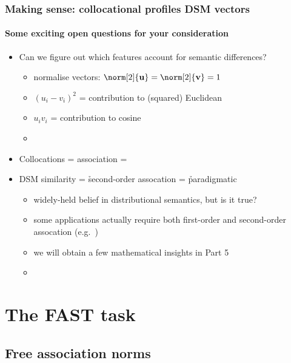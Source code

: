 \documentclass[t]{beamer} %
\begin{document}
\begin{frame}
  \frametitle{Making sense: collocational profiles \vs DSM vectors}
  \framesubtitle{Some exciting open questions for your consideration}
  
  \begin{itemize}
  \item Can we figure out which features account for semantic differences?
    \begin{itemize}
    \item normalise vectors: $\norm[2]{\vu} = \norm[2]{\vv} = 1$
    \item $(u_i - v_i)^2$ = contribution to (squared) Euclidean 
    \item $u_i v_i$ = contribution to cosine 
    \item[]
    \end{itemize}
  \item<2-> Collocations =  association = 
  \item<2->  DSM similarity = \h{second-order} assocation = \h{paradigmatic}
    \begin{itemize}
    \item widely-held belief in distributional semantics, but is it true?
    \item some applications actually require both first-order and second-order assocation (e.g.\ )
    \item[\hand] we will obtain a few  mathematical insights in Part 5
    \item[]
    \end{itemize}
  \end{itemize}

  \vfill
\end{frame}


\section{The FAST task}

\subsection{Free association norms}
\end{document}
